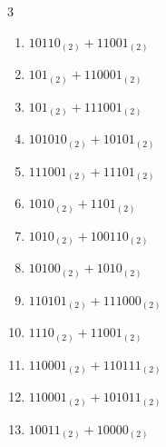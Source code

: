 \begin{multicols}{3}
\begin{enumerate}

  \item $10110_{(2)} + 11001_{(2)}$


  \item $101_{(2)} + 110001_{(2)}$


  \item $101_{(2)} + 111001_{(2)}$


\columnbreak %

\resetques

  \item $101010_{(2)} + 10101_{(2)}$


  \item $111001_{(2)} + 11101_{(2)}$


  \item $1010_{(2)} + 1101_{(2)}$


  \item $1010_{(2)} + 100110_{(2)}$


  \item $10100_{(2)} + 1010_{(2)}$


  \item $110101_{(2)} + 111000_{(2)}$


  \item $1110_{(2)} + 11001_{(2)}$


  \item $110001_{(2)} + 110111_{(2)}$


  \item $110001_{(2)} + 101011_{(2)}$


  \item $10011_{(2)} + 10000_{(2)}$


\end{enumerate}
\end{multicols}
